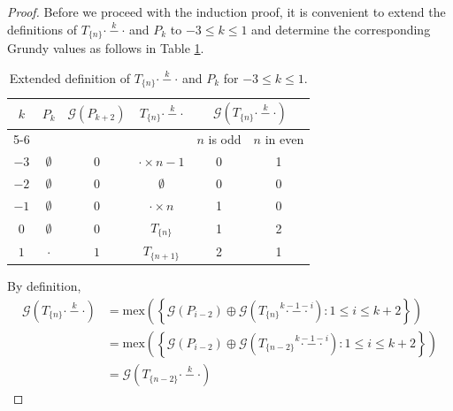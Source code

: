 \documentclass[12pt]{elsarticle}
\newtheorem*{theorem A}{Theorem A}
\newtheorem*{theorem B}{N\"olker's Theorem}
\theoremstyle{remark}
\theoremstyle{remark}
\theoremstyle{definition}
\begin{document}
\begin{proof}
	Before we proceed with the induction proof, it is convenient to extend the definitions of $T_{\{n\}} \stackrel{k}{\cdot - \cdot}$ and $P_{k}$ to $-3 \le k \le 1$ and determine the corresponding Grundy values as follows in Table \ref{extendedgrafting}.
	 \begin{table}[]
	 	\centering
	 	\begin{tabular}{|c|c|c|c|cc|}
	 		\hline
	 		\multirow{2}{*}{$k$} & \multirow{2}{*}{$P_k$} & \multirow{2}{*}{$\mathcal{G}\left(P_{k+2} \right)$} & \multirow{2}{*}{$T_{\{n\}} \stackrel{k}{\cdot - \cdot}$} & \multicolumn{2}{c|}{$\mathcal{G}\left(T_{\{n\}} \stackrel{k}{\cdot - \cdot}\right)$}                 \\ \cline{5-6} 
	 		&                       &                          &                    & \multicolumn{1}{c|}{$n$ is odd} & $n$ in even \\ \hline
	 		$-3$ & $\emptyset$  & $0$       & $\cdot \times n-1$  &  \multicolumn{1}{c|}{0} & 1    \\ \hline
	 		$-2$ & $\emptyset$  & $0$       & $\emptyset$  & \multicolumn{1}{c|}{0} & 0     \\ \hline
	 		$-1$ & $\emptyset$  & $0$       & $\cdot \times n$  & \multicolumn{1}{c|}{1} & 0     \\ \hline
	 		$0$  & $\emptyset$  & $0$       & $T_{\{n\}}$  &  \multicolumn{1}{c|}{1} & 2    \\ \hline
	 		$1$  & $\cdot$  	& $1$       & $T_{\{n+1\}}$  & \multicolumn{1}{c|}{2} & 1     \\ \hline
	 	\end{tabular}
	 	\caption{Extended definition of $T_{\{n\}} \stackrel{k}{\cdot - \cdot}$ and $P_{k}$ for $-3 \le k \le 1$. \label{extendedgrafting}}
	 \end{table}
	By definition,
	\begin{align*}
		\mathcal{G}\left(T_{\{n\}} \stackrel{k}{\cdot - \cdot}\right) &= \mathrm{mex}\left(\left\{\mathcal{G}\left(P_{i-2}\right) \oplus \mathcal{G}\left(T_{\{n\}} \stackrel{k-1-i}{\cdot - \cdot}\right) : 1 \le i \le k+2 \right\}\right)\\
		&= \mathrm{mex}\left(\left\{\mathcal{G}\left(P_{i-2}\right) \oplus \mathcal{G}\left(T_{\{n-2\}} \stackrel{k-1-i}{\cdot - \cdot}\right): 1 \le i \le k+2 \right\}\right)\\
		&= \mathcal{G}\left(T_{\{n-2\}} \stackrel{k}{\cdot - \cdot}\right)
	\end{align*}
\end{proof}
\end{document}
